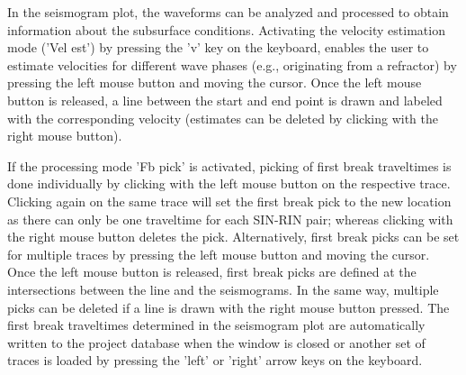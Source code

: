 \documentclass[a4paper,fleqn]{cas-sc}
\begin{document}
In the seismogram plot, the waveforms can be analyzed and processed to obtain information about the subsurface conditions. Activating the velocity estimation mode ('Vel est') by pressing the 'v' key on the keyboard, enables the user to estimate velocities for different wave phases (e.g., originating from a refractor) by pressing the left mouse button and moving the cursor. Once the left mouse button is released, a line between the start and end point is drawn and labeled with the corresponding velocity (estimates can be deleted by clicking with the right mouse button).

If the processing mode 'Fb pick' is activated, picking of first break traveltimes is done individually by clicking with the left mouse button on the respective trace. Clicking again on the same trace will set the first break pick to the new location as there can only be one traveltime for each SIN-RIN pair; whereas clicking with the right mouse button deletes the pick. Alternatively, first break picks can be set for multiple traces by pressing the left mouse button and moving the cursor. 
Once the left mouse button is released, first break picks are defined at the intersections between the line and the seismograms. In the same way, multiple picks can be deleted if a line is drawn with the right mouse button pressed. The first break traveltimes determined in the seismogram plot are automatically written to the project database when the window is closed or another set of traces is loaded by pressing the 'left' or 'right' arrow keys on the keyboard. 
\end{document}
